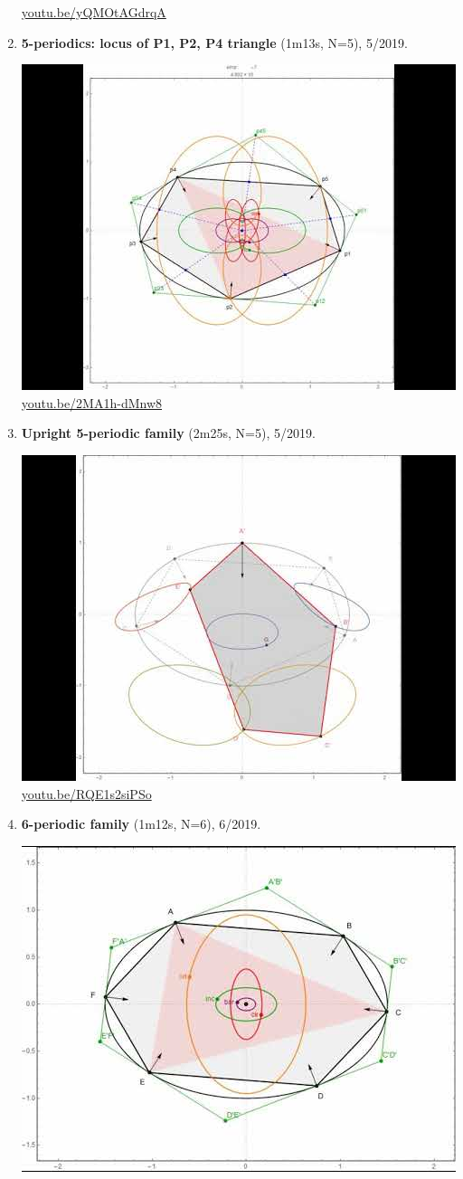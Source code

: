\documentclass[12pt]{amsart}
\begin{document}
\begin{enumerate}[resume]
\begin{center}
\href{https://youtu.be/yQMOtAGdrqA}{\url{youtu.be/yQMOtAGdrqA}}\end{center}
% 
\item \textbf{5-periodics: locus of P1, P2, P4 triangle} (1m13s, N=5), 5/2019. 
\begin{center}\includegraphics[width=.5\textwidth]{pics/2MA1h-dMnw8.jpg} \\ 
\href{https://youtu.be/2MA1h-dMnw8}{\url{youtu.be/2MA1h-dMnw8}}\end{center}
% 
\item \textbf{Upright 5-periodic family} (2m25s, N=5), 5/2019. 
\begin{center}\includegraphics[width=.5\textwidth]{pics/RQE1s2siPSo.jpg} \\ 
\href{https://youtu.be/RQE1s2siPSo}{\url{youtu.be/RQE1s2siPSo}}\end{center}
% 
\item \textbf{6-periodic family} (1m12s, N=6), 6/2019. 
\begin{center}\includegraphics[width=.5\textwidth]{pics/YZfFGew4azI.jpg} \\ 

\end{center}
\end{enumerate}
\end{document}
